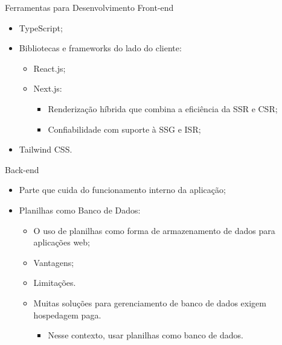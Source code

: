 \begin{frame}{Ferramentas para Desenvolvimento Front-end}
    \begin{itemize}
        \item TypeScript; \vspace{0.25cm}
        \item Bibliotecas e frameworks do lado do cliente: \vspace{0.25cm}
              \begin{itemize}
                  \item React.js; \vspace{0.25cm}
                  \item Next.js: \vspace{0.25cm}
                        \begin{itemize}
                            \item Renderização híbrida que combina a eficiência da SSR e CSR; \vspace{0.25cm}
                            \item Confiabilidade com suporte à SSG e ISR; \vspace{0.25cm}
                        \end{itemize}
              \end{itemize}
        \item Tailwind CSS. \vspace{0.5cm}
    \end{itemize}
\end{frame}

\begin{frame}{Back-end}
    \begin{itemize}
        \item Parte que cuida do funcionamento interno da aplicação; \vspace{0.25cm}
        \item Planilhas como Banco de Dados: \vspace{0.25cm}
              \begin{itemize}
                  \item O uso de planilhas como forma de armazenamento de dados para aplicações web; \vspace{0.25cm}
                  \item Vantagens; \vspace{0.25cm}
                  \item Limitações. \vspace{0.25cm}
                  \item Muitas soluções para gerenciamento de banco de dados exigem hospedagem paga. \vspace{0.25cm}
                  \begin{itemize}
                    \item Nesse contexto, usar planilhas como banco de dados.
                  \end{itemize}
              \end{itemize}
    \end{itemize}
\end{frame}

